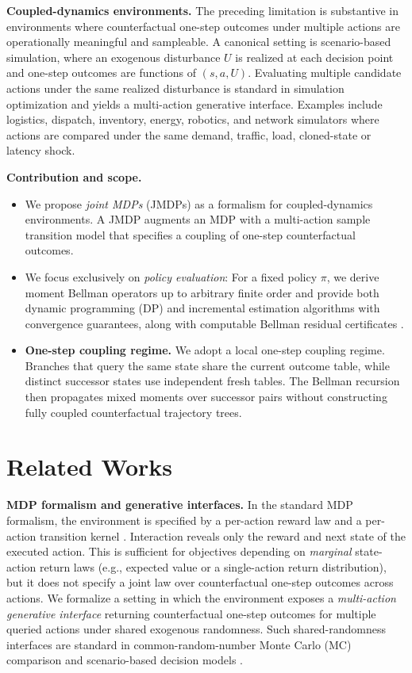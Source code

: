 \documentclass[accepted]{uai2026}
\theoremstyle{plain}
\theoremstyle{definition}
\theoremstyle{remark}
\newcommand{\1}{\mathbbm{1}}
\begin{document}
\textbf{Coupled-dynamics environments.} The preceding limitation is substantive in environments where counterfactual one-step outcomes under multiple actions are operationally meaningful and sampleable. A canonical setting is scenario-based simulation, where an exogenous disturbance $U$ is realized at each decision point and one-step outcomes are functions of $(s, a, U)$. Evaluating multiple candidate actions under the same realized disturbance is standard in simulation optimization \citep{glasserman2004monte, shapiro2021lectures} and yields a multi-action generative interface. Examples include logistics, dispatch, inventory, energy, robotics, and network simulators where actions are compared under the same demand, traffic, load, cloned-state or latency shock.

\textbf{Contribution and scope.} 
\begin{itemize}[leftmargin=*]
\item We propose \textit{joint MDPs} (JMDPs) as a formalism for coupled-dynamics environments. A JMDP augments an MDP with a multi-action sample transition model that specifies a coupling of one-step counterfactual outcomes. 
\item We focus exclusively on \textit{policy evaluation}: For a fixed policy $\pi$, we derive moment Bellman operators up to arbitrary finite order and provide both dynamic programming (DP) and incremental estimation algorithms with convergence guarantees, along with computable Bellman residual certificates \citep{scherrer2010should}.
\item \textbf{One-step coupling regime.} We adopt a local one-step coupling regime. Branches that query the same state share the current outcome table, while distinct successor states use independent fresh tables. The Bellman recursion then propagates mixed moments over successor pairs without constructing fully coupled counterfactual trajectory trees.
\end{itemize}

\section{Related Works}\label{sec:related}
\textbf{MDP formalism and generative interfaces.} In the standard MDP formalism, the environment is specified by a per-action reward law and a per-action transition kernel \citep{puterman, BartoSutton, DRL-textbook}. Interaction reveals only the reward and next state of the executed action. This is sufficient for objectives depending on \textit{marginal} state-action return laws (e.g., expected value or a single-action return distribution), but it does not specify a joint law over counterfactual one-step outcomes across actions. We formalize a setting in which the environment exposes a \textit{multi-action generative interface} returning counterfactual one-step outcomes for multiple queried actions under shared exogenous randomness. Such shared-randomness interfaces are standard in common-random-number Monte Carlo (MC) comparison and scenario-based decision models
\citep{glasserman2004monte, shapiro2021lectures}.
\end{document}
